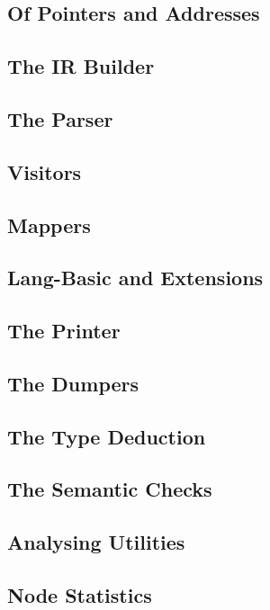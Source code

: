 \subsection{Of Pointers and Addresses}
\label{sec:Compiler.Core.PointersAndAddresses}

\subsection{The IR Builder}
\label{sec:Compiler.Core.Builder}
\subsection{The Parser}
\label{sec:Compiler.Core.Parser}
\subsection{Visitors}
\label{sec:Compiler.Core.Visitors}
\subsection{Mappers}
\label{sec:Compiler.Core.Mappers}
\subsection{Lang-Basic and Extensions}
\label{sec:Compiler.Core.LangBasic}
\subsection{The Printer}
\label{sec:Compiler.Core.Printer}
\subsection{The Dumpers}
\label{sec:Compiler.Core.Dumpers}
\subsection{The Type Deduction}
\label{sec:Compiler.Core.TypeDeduction}
\subsection{The Semantic Checks}
\label{sec:Compiler.Core.SemanticChecks}
\subsection{Analysing Utilities}
\label{sec:Compiler.Core.Analysis}
\subsection{Node Statistics}
\label{sec:Compiler.Core.Statistics}
